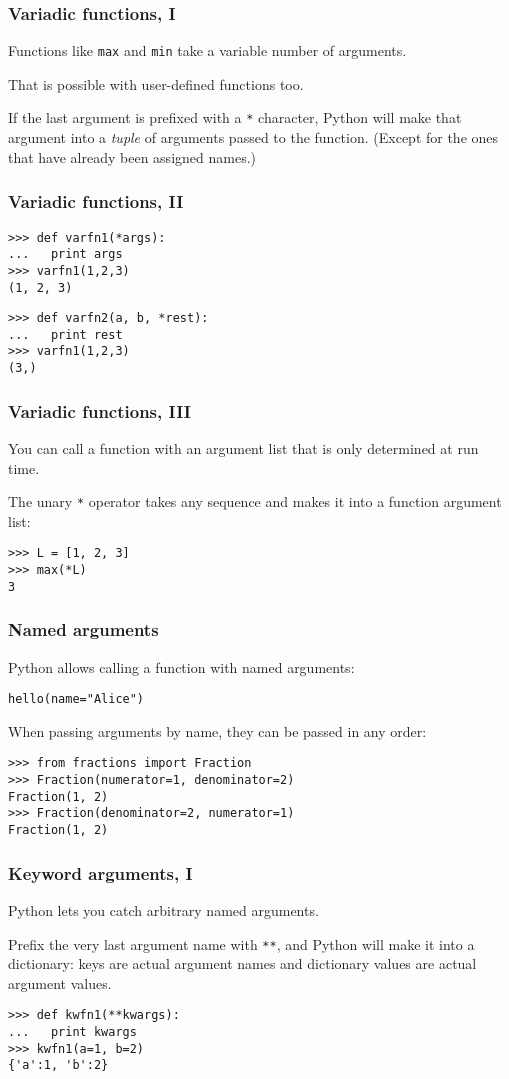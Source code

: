 \documentclass[english,serif,mathserif,xcolor=pdftex,dvipsnames,table]{beamer}
\begin{document}
\begin{frame}[fragile]
  \frametitle{Variadic functions, I}
  Functions like \texttt{max} and \texttt{min} take a variable number of arguments.

  \+
  That is possible with user-defined functions too.

  \+
  If the last argument is prefixed with a \texttt{*} character,
  Python will make that argument into a \emph{tuple} of arguments
  passed to the function. (Except for the ones that have already been
  assigned names.)
\end{frame}


\begin{frame}
  \frametitle{Variadic functions, II}
\begin{lstlisting}
>>> def varfn1(*args):
...   print args
>>> varfn1(1,2,3)
(1, 2, 3)
\end{lstlisting}

\begin{lstlisting}
>>> def varfn2(a, b, *rest):
...   print rest
>>> varfn1(1,2,3)
(3,)
\end{lstlisting}
\end{frame}


\begin{frame}[fragile]
  \frametitle{Variadic functions, III}
  You can call a function with an argument list that is only
  determined at run time.

  \+
  The unary \texttt{*} operator takes any sequence and makes it
  into a function argument list:
\begin{lstlisting}
>>> L = [1, 2, 3]
>>> max(*L)
3
\end{lstlisting}
\end{frame}


\begin{frame}[fragile]
  \frametitle{Named arguments}
Python allows calling a function with named arguments:
\begin{lstlisting}
hello(name="Alice")
\end{lstlisting}
When passing arguments by name, they can be passed in any order:
\begin{lstlisting}
>>> from fractions import Fraction
>>> Fraction(numerator=1, denominator=2)
Fraction(1, 2)
>>> Fraction(denominator=2, numerator=1)
Fraction(1, 2)
\end{lstlisting}
\end{frame}


\begin{frame}[fragile]
  \frametitle{Keyword arguments, I}
  Python lets you catch arbitrary named arguments.

  \+
  Prefix the very last argument name with \texttt{**}, and Python
  will make it into a dictionary: keys are actual argument names and
  dictionary values are actual argument values.

  \+
\begin{lstlisting}
>>> def kwfn1(**kwargs):
...   print kwargs
>>> kwfn1(a=1, b=2)
{'a':1, 'b':2}
\end{lstlisting}
\end{frame}
\end{document}
